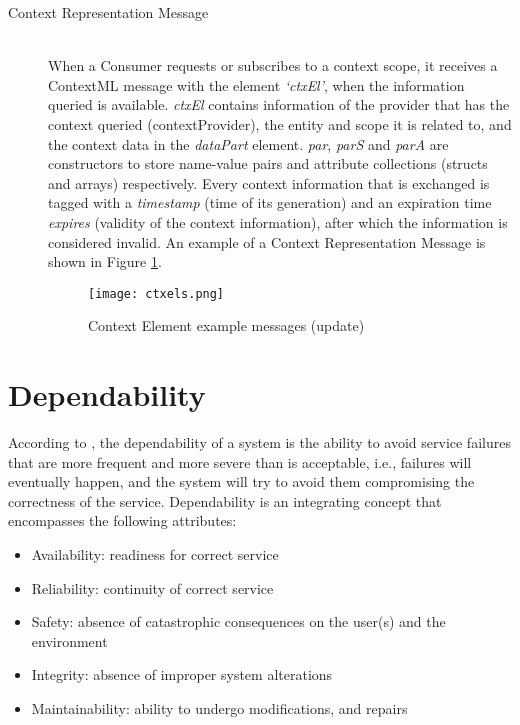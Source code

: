 \begin{description}
\item[Context Representation Message]\hfill \\
When a Consumer requests or subscribes to a context scope, it receives a ContextML message with the element \textit{‘ctxEl’}, when the information queried is available. \textit{ctxEl} contains information of the provider that has the context queried (contextProvider), the entity and scope it is related to, and the context data in the \textit{dataPart} element. \textit{par}, \textit{parS} and \textit{parA} are constructors to store name-value pairs and attribute collections (structs and arrays) respectively. Every context information that is exchanged is tagged with a \textit{timestamp} (time of its generation) and an expiration time \textit{expires} (validity of the context information), after which the information is considered invalid. An example of a Context Representation Message is shown in Figure \ref{fig:ctxels}.

\begin{figure}[h]
	\centering
	\texttt{[image: ctxels.png]}
	\caption{Context Element example messages (update)}
	\label{fig:ctxels}
	
\end{figure}


\end{description}


\section{Dependability}
\label{sec:fault_tolerance}

According to \cite{avivzienis2004basic}, the dependability of a system is the ability to avoid service failures that are more frequent and more severe than is acceptable, i.e., failures will eventually happen, and the system will try to avoid them compromising the correctness of the service. Dependability is an integrating concept that encompasses the following attributes:
\begin{itemize}
	\item{Availability:} readiness for correct service
	\item{Reliability:} continuity of correct service
	\item{Safety:} absence of catastrophic consequences on the user(s) and the environment
	\item{Integrity:} absence of improper system alterations
	\item{Maintainability:} ability to undergo modifications, and repairs
\end{itemize}
